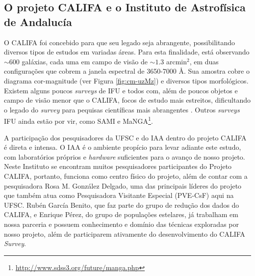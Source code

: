 \documentclass[a4paper,12pt]{article}
\begin{document}
\subsection{O projeto CALIFA e o Instituto de Astrofísica de Andalucía}
\vspace{0.3cm}
O CALIFA foi concebido para que seu legado seja abrangente, possibilitando diversos tipos de estudos
em variadas áreas. Para esta finalidade, está observando $\sim 600$ galáxias, cada uma em campo de
visão de $\sim1.3$ arcmin$^2$, em duas configurações que cobrem a janela espectral de 3650-7000 \AA.
Sua amostra cobre o diagrama cor-magnitude (ver Figura \ref{fig:cm-uzMz}) e diversos tipos
morfológicos. Existem alguns poucos {\em surveys} de IFU e todos com, além de poucos objetos e campo
de visão menor que o CALIFA, focos de estudo mais estreitos, dificultando o legado do {\em survey}
para pequisas científicas mais abrangentes \citep[SAURON;][região central de 72 galáxias com $z <
0.01$.]{deZeeuw.etal.2002a} \citep[PINGS;][algumas galáxias muito próximas ($\sim 10$ Mpc) e o
estudo atual de 70 (U)LIRGs com $z <0.26$]{RosalesOrtega.etal.2010a} \citep[VENGA;][$30$ galáxias
espirais]{Blanc.etal.2010a} \citep[ATLAS\textsuperscript{3D};][260 galáxias {\em early-type}
próximas]{Cappellari.etal.2011a}. Outros {\em surveys} IFU ainda estão por vir, como SAMI
\citep{Croom.etal.2012a} e MaNGA\footnote{\url{http://www.sdss3.org/future/manga.php}}.

A participação dos pesquisadores da UFSC e do IAA dentro do projeto CALIFA é direta e intensa. O IAA
é o ambiente propício para levar adiante este estudo, com laboratórios próprios e {\em hardware}
suficientes para o avanço de nosso projeto. Neste Instituto se encontram muitos pesquisadores
participantes do Projeto CALIFA, portanto, funciona como centro físico do projeto, além de contar
com a pesquisadora Rosa M. González Delgado, uma das principais líderes do projeto que também atua
como Pesquisadora Visitante Especial (PVE-CsF) aqui na UFSC. Rubén García Benito, que faz parte do
grupo de redução dos dados do CALIFA, e Enrique Pérez, do grupo de populações estelares, já
trabalham em nossa parceria e possuem conhecimento e domínio das técnicas exploradas por nosso
projeto, além de participarem ativamente do desenvolvimento do CALIFA {\em Survey}.
\end{document}
